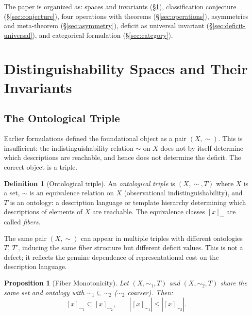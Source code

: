\documentclass[12pt, a4paper]{article}
\theoremstyle{plain}
\newtheorem{proposition}[theorem]{Proposition}
\theoremstyle{definition}
\newtheorem{definition}[theorem]{Definition}
\theoremstyle{remark}
\begin{document}
The paper is organized as: spaces and invariants (\S\ref{sec:spaces}),
classification conjecture (\S\ref{sec:conjecture}), four operations with
theorems (\S\ref{sec:operations}), asymmetries and meta-theorem
(\S\ref{sec:asymmetry}), deficit as universal invariant
(\S\ref{sec:deficit-universal}), and categorical formulation
(\S\ref{sec:category}).

\section{Distinguishability Spaces and Their Invariants}
\label{sec:spaces}

\subsection{The Ontological Triple}

Earlier formulations defined the foundational object as a pair $(X,\sim)$.
This is insufficient: the indistinguishability relation $\sim$ on $X$ does
not by itself determine which descriptions are reachable, and hence does
not determine the deficit. The correct object is a triple.

\begin{definition}[Ontological triple]
\label{def:triple}
An \emph{ontological triple} is $(X,\sim,T)$ where $X$ is a set, $\sim$ is
an equivalence relation on $X$ (observational indistinguishability), and
$T$ is an ontology: a description language or template hierarchy determining
which descriptions of elements of $X$ are reachable. The equivalence classes
$[x]_\sim$ are called \emph{fibers}.
\end{definition}

The same pair $(X,\sim)$ can appear in multiple triples with different ontologies
$T$, $T'$, inducing the same fiber structure but different deficit values.
This is not a defect; it reflects the genuine dependence of representational
cost on the description language.

\begin{proposition}[Fiber Monotonicity]
\label{prop:monotone}
Let $(X,\sim_1,T)$ and $(X,\sim_2,T)$ share the same set and ontology with
$\sim_1\subseteq\sim_2$ ($\sim_2$ coarser). Then:
\[
  [x]_{\sim_1}\subseteq[x]_{\sim_2},\qquad
  |[x]_{\sim_1}|\le|[x]_{\sim_2}|.
\]
\end{proposition}
\end{document}
